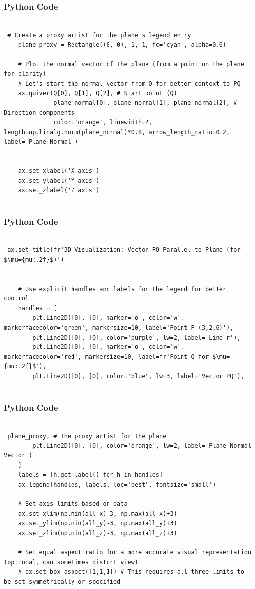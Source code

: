 \documentclass{beamer}
\begin{document}
\begin{frame}[fragile]
    \frametitle{Python Code}
    \begin{lstlisting}

 # Create a proxy artist for the plane's legend entry
    plane_proxy = Rectangle((0, 0), 1, 1, fc='cyan', alpha=0.6)
    
    # Plot the normal vector of the plane (from a point on the plane for clarity)
    # Let's start the normal vector from Q for better context to PQ
    ax.quiver(Q[0], Q[1], Q[2], # Start point (Q)
              plane_normal[0], plane_normal[1], plane_normal[2], # Direction components
              color='orange', linewidth=2, length=np.linalg.norm(plane_normal)*0.8, arrow_length_ratio=0.2, label='Plane Normal')


    ax.set_xlabel('X axis')
    ax.set_ylabel('Y axis')
    ax.set_zlabel('Z axis')
   

    \end{lstlisting}
\end{frame}

\begin{frame}[fragile]
    \frametitle{Python Code}
    \begin{lstlisting}

 ax.set_title(fr'3D Visualization: Vector PQ Parallel to Plane (for $\mu={mu:.2f}$)')
    
    
    # Use explicit handles and labels for the legend for better control
    handles = [
        plt.Line2D([0], [0], marker='o', color='w', markerfacecolor='green', markersize=10, label='Point P (3,2,6)'),
        plt.Line2D([0], [0], color='purple', lw=2, label='Line r'),
        plt.Line2D([0], [0], marker='o', color='w', markerfacecolor='red', markersize=10, label=fr'Point Q for $\mu={mu:.2f}$'),
        plt.Line2D([0], [0], color='blue', lw=3, label='Vector PQ'),
       

    \end{lstlisting}
\end{frame}

\begin{frame}[fragile]
    \frametitle{Python Code}
    \begin{lstlisting}

 plane_proxy, # The proxy artist for the plane
        plt.Line2D([0], [0], color='orange', lw=2, label='Plane Normal Vector')
    ]
    labels = [h.get_label() for h in handles]
    ax.legend(handles, labels, loc='best', fontsize='small')
    
    # Set axis limits based on data
    ax.set_xlim(np.min(all_x)-3, np.max(all_x)+3)
    ax.set_ylim(np.min(all_y)-3, np.max(all_y)+3)
    ax.set_zlim(np.min(all_z)-3, np.max(all_z)+3)
    
    # Set equal aspect ratio for a more accurate visual representation (optional, can sometimes distort view)
    # ax.set_box_aspect([1,1,1]) # This requires all three limits to be set symmetrically or specified
    


    \end{lstlisting}
\end{frame}
\end{document}
